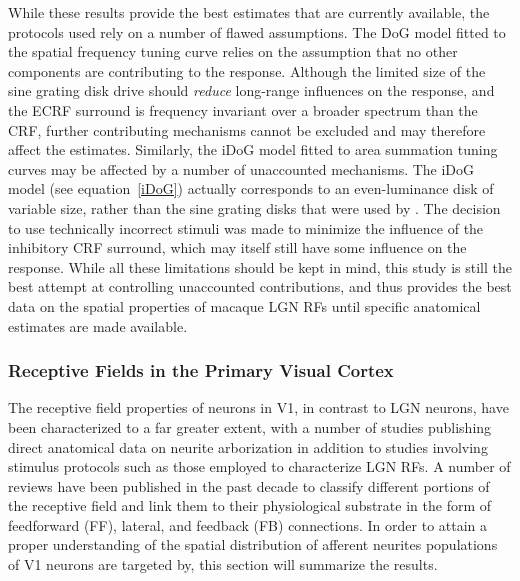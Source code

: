While these results provide the best estimates that are currently
available, the protocols used rely on a number of flawed
assumptions. The DoG model fitted to the spatial frequency tuning
curve relies on the assumption that no other components are
contributing to the response. Although the limited size of the sine
grating disk drive should \emph{reduce} long-range influences on the
response, and the ECRF surround is frequency invariant over a broader
spectrum than the CRF, further contributing mechanisms cannot be
excluded and may therefore affect the estimates. Similarly, the iDoG
model fitted to area summation tuning curves may be affected by a
number of unaccounted mechanisms. The iDoG model (see
equation~\ref{iDoG}) actually corresponds to an even-luminance disk of
variable size, rather than the sine grating disks that were used by
\cite{Sceniak2006}. The decision to use technically incorrect stimuli
was made to minimize the influence of the inhibitory CRF surround,
which may itself still have some influence on the response.  While all
these limitations should be kept in mind, this study is still the best
attempt at controlling unaccounted contributions, and thus provides
the best data on the spatial properties of macaque LGN RFs until
specific anatomical estimates are made available.

\subsubsection*{Receptive Fields in the Primary Visual Cortex}

The receptive field properties of neurons in V1, in contrast to LGN
neurons, have been characterized to a far greater extent, with a number
of studies publishing direct anatomical data on neurite arborization
in addition to studies involving stimulus protocols such as those
employed to characterize LGN RFs. A number of reviews have been
published in the past decade to classify different portions of the
receptive field and link them to their physiological substrate in the
form of feedforward (FF), lateral, and feedback (FB) connections. In
order to attain a proper understanding of the spatial distribution of
afferent neurites populations of V1 neurons are targeted by, this
section will summarize the results.

